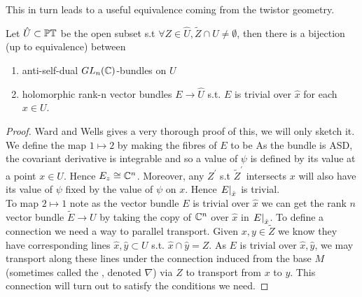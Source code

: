 \documentclass{article}
\begin{document}
This in turn leads to a useful equivalence coming from the twistor geometry. 
\begin{theorem}
	Let $\hat{U} \subset \mathbb{PT}$ be the open subset s.t $\forall Z \in \hat{U}, \tilde{Z} \cap U \neq \emptyset$, then there is a bijection (up to equivalence) between
	\begin{enumerate}
		\item anti-self-dual $GL_n(\mathbb{C})$-bundles on $U$ 
		\item holomorphic rank-n vector bundles $E\to \hat{U}$ s.t. $E$ is trivial over $\hat{x}$ for each $x \in U$. 
	\end{enumerate}
\end{theorem}
\begin{proof}
	Ward and Wells \cite{Ward1991} gives a very thorough proof of this, we will only sketch it. \\
	We define the map $1 \mapsto 2$ by making the fibres of $E$ to be 
As the bundle is ASD, the covariant derivative is integrable and so a value of $\psi$ is defined by its value at a point $x\in U$. Hence $E_z \cong \mathbb{C}^n$. Moreover, any $Z^\prime$ s.t $\tilde{Z}^\prime$ intersects $x$ will also have its value of $\psi$ fixed by the value of $\psi$ on $x$. Hence $\left. E \right\rvert_{\hat{x}}$ is trivial. \\
To map $2 \mapsto 1$ note as the vector bundle $E$ is trivial over $\hat{x}$ we can get the rank $n$ vector bundle $\tilde{E} \to U$ by taking the copy of $\mathbb{C}^n$ over $\hat{x}$ in $\left. E \right\rvert_{\hat{x}}$. To define a connection we need a way to parallel transport. Given $x,y \in \tilde{Z}$ we know they have corresponding lines $\hat{x},\hat{y} \subset U$ s.t. $\hat{x} \cap \hat{y} = Z$. As $E$ is trivial over $\hat{x},\hat{y}$, we may transport along these lines under the connection induced from the base $M$ (sometimes called the , denoted $\nabla$) via $Z$ to transport from $x$ to $y$. This connection will turn out to satisfy the conditions we need. 
\end{proof}
\end{document}
